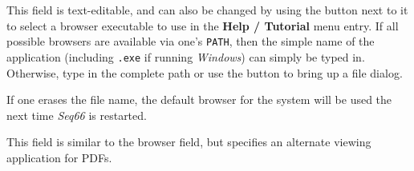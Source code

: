    This field is text-editable, and can also be changed by using the button
   next to it to select a browser executable to use in the
   \textbf{Help / Tutorial} menu entry. If all possible browsers are available
   via one's \texttt{PATH}, then the simple name of the application
   (including \texttt{.exe} if running \textsl{Windows}) can simply be typed
   in. Otherwise, type in the complete path or use the button to bring up
   a file dialog.

   If one erases the file name, the default browser for the system will be
   used the next time \textsl{Seq66} is restarted.

   This field is similar to the browser field, but specifies an alternate
   viewing application for PDFs.

